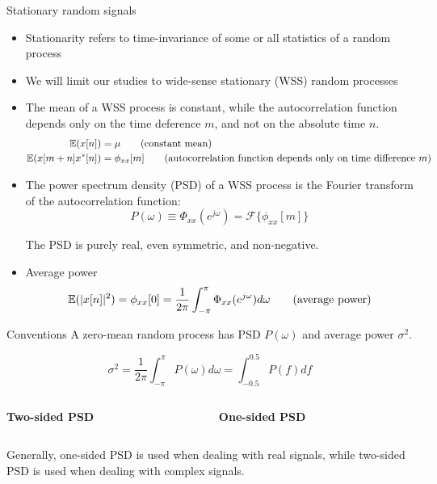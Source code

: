 \documentclass[10pt]{beamer}
\begin{document}
\begin{frame}{Stationary random signals}
	\begin{itemize}
		\item Stationarity refers to time-invariance of some or all statistics of a random process
		\item We will limit our studies to wide-sense stationary (WSS) random processes
		\item The mean of a WSS process is constant, while the autocorrelation function depends only on the time deference $m$, and not on the absolute time $n$.
		\begin{align}
			\operatorname{\mathbb{E}}(x[n]) &=\mu \tag{constant mean} \\
			\operatorname{\mathbb{E}}(x[m+n]x^*[n]) &= \phi_{xx}[m] \tag{autocorrelation function depends only on time difference $m$}
		\end{align}
		\item The power spectrum density (PSD) of a WSS process is the Fourier transform of the autocorrelation function:
		\begin{equation*}
			P(\omega) \equiv \Phi_{xx}(e^{j\omega}) = \mathcal{F}\{\phi_{xx}[m]\}
		\end{equation*}
		
		The PSD is purely real, even symmetric, and non-negative. 
		\item Average power
		\begin{equation}
			\operatorname{\mathbb{E}}(|x[n]|^2) = \phi_{xx}[0] = \frac{1}{2\pi}\int_{-\pi}^{\pi} \Phi_{xx}(e^{j\omega}) d\omega \tag{average power}
		\end{equation}
	\end{itemize}
\end{frame}

\begin{frame}{Conventions}
A zero-mean random process has PSD $P(\omega)$ and average power $\sigma^2$.

\begin{equation*}
	\sigma^2 = \frac{1}{2\pi} \int_{-\pi}^{\pi} P(\omega)d\omega = \int_{-0.5}^{0.5} P(f)df
\end{equation*}

\begin{columns}
	\begin{column}{0.5\textwidth}
		\textbf{Two-sided PSD}
	\end{column}

	\begin{column}{0.5\textwidth}
		\textbf{One-sided PSD}
	\end{column}
\end{columns}
\begin{center}
	\resizebox{\textwidth}{!}{}
\end{center}
Generally, one-sided PSD is used when dealing with real signals, while two-sided PSD is used when dealing with complex signals.
\end{frame}
\end{document}
